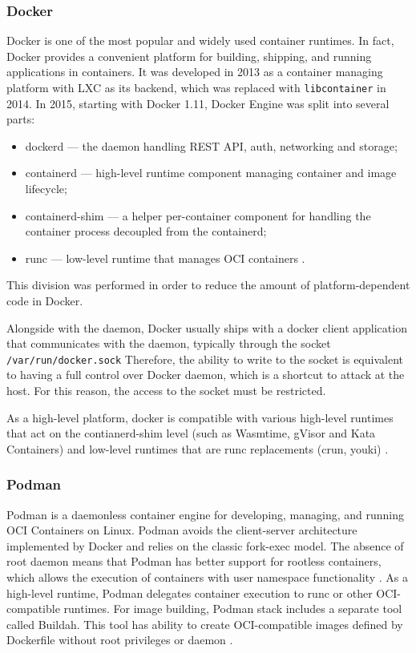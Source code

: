 \subsubsection*{Docker}

Docker is one of the most popular and widely used container runtimes. In fact, Docker provides a convenient platform for building, shipping, and running applications in containers. It was developed in 2013 as a container managing platform with LXC as its backend, which was replaced with \texttt{libcontainer} in 2014. In 2015, starting with Docker 1.11, Docker Engine was split into several parts:

\begin{itemize}
  \item dockerd — the daemon handling REST API, auth, networking and storage;
  \item containerd — high-level runtime component managing container and image lifecycle;
  \item containerd-shim — a helper per-container component for handling the container process decoupled from the containerd;
  \item runc — low-level runtime that manages OCI containers \cite{acm:1}.
\end{itemize}

This division was performed in order to reduce the amount of platform-dependent code in Docker.

Alongside with the daemon, Docker usually ships with a docker client application that communicates with the daemon, typically through the socket \texttt{/var/run/docker.sock} \cite{book:docker} Therefore, the ability to write to the socket is equivalent to having a full control over Docker daemon, which is a shortcut to attack at the host. For this reason, the access to the socket must be restricted.

As a high-level platform, docker is compatible with various high-level runtimes that act on the contianerd-shim level (such as Wasmtime, gVisor and Kata Containers) and low-level runtimes that are runc replacements (crun, youki) \cite{d:alternative-runtimes}.

\subsubsection*{Podman}

Podman is a daemonless container engine for developing, managing, and running OCI Containers on Linux. Podman avoids the client-server architecture implemented by Docker and relies on the classic fork-exec model. The absence of root daemon means that Podman has better support for rootless containers, which allows the execution of containers with user namespace functionality \cite{acm:2}. As a high-level runtime, Podman delegates container execution to runc or other OCI-compatible runtimes. For image building, Podman stack includes a separate tool called Buildah. This tool has ability to create OCI-compatible images defined by Dockerfile without root privileges or daemon \cite{gh:buildah}.

